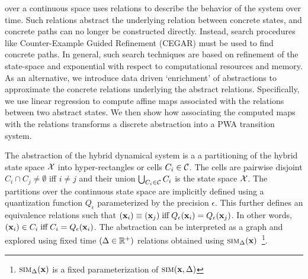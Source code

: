  over a continuous space uses relations
to describe the behavior of the system over time. Such relations
abstract the underlying relation between concrete states, and concrete
paths can no longer be constructed directly. Instead, search
procedures like Counter-Example Guided Refinement (CEGAR) must be used
to find concrete paths. In general, such search techniques are based
on refinement of the state-space and exponential with respect to
computational resources and memory. As an alternative, we introduce
data driven `enrichment' of abstractions to approximate the concrete
relations underlying the abstract relations.  Specifically, we use
linear regression to compute affine maps associated with the relations
between two abstract states. We then show how associating the computed
maps with the relations transforms a discrete abstraction into a PWA
transition system.



The abstraction of the hybrid dynamical system is a a partitioning of
the hybrid state space $\mathcal{X}$ into hyper-rectangles or cells
$C_i \in \mathcal{C}$. The cells are pairwise disjoint $C_i \cap C_j \neq
\emptyset$ iff $i \neq j$ and their union $\bigcup_{C_i\in\mathcal{C}}C_i$
is the state space $\mathcal{X}$. The partitions over the continuous
state space are implicitly defined using a quantization function
$Q_\epsilon$ parameterized by the precision $\epsilon$.  This further
defines an equivalence relations such that $(\mathbf{x}_i) \equiv (\mathbf{x}_j)
\;\text{iff}\; Q_\epsilon(\mathbf{x}_i) = Q_\epsilon(\mathbf{x}_j)$.  In other
words, $(\mathbf{x}_i) \in C_i \; \text{iff} \; C_i = Q_\epsilon(\mathbf{x}_i)$. The
abstraction can be interpreted as a graph and explored using fixed
time $(\Delta\in\mathbb{R}^+)$ relations obtained using
$\mbox{\sc sim}_\Delta(\mathbf{x})$~\footnote{$\mbox{\sc sim}_\Delta(\mathbf{x})$ is a fixed
parameterization of $\mbox{\sc sim}(\mathbf{x},\Delta)$}.

